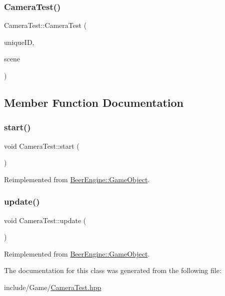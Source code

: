 \subsubsection{\texorpdfstring{Camera\+Test()}{CameraTest()}}
{\footnotesize\ttfamily Camera\+Test\+::\+Camera\+Test (\begin{DoxyParamCaption}\item[{int}]{unique\+ID,  }\item[{\mbox{\hyperlink{class_beer_engine_1_1_a_scene}{Beer\+Engine\+::\+A\+Scene}} \&}]{scene }\end{DoxyParamCaption})}



\subsection{Member Function Documentation}
\mbox{\label{class_camera_test_a33618b16d2906b67b68e55ad15a8a33b}} 
\subsubsection{\texorpdfstring{start()}{start()}}
{\footnotesize\ttfamily void Camera\+Test\+::start (\begin{DoxyParamCaption}\item[{void}]{ }\end{DoxyParamCaption})\hspace{0.3cm}{\ttfamily [virtual]}}



Reimplemented from \mbox{\hyperlink{class_beer_engine_1_1_game_object_a2caa6e6105c6766fdac3688ff1e74f00}{Beer\+Engine\+::\+Game\+Object}}.

\mbox{\label{class_camera_test_a5bacc3399e57aa311e8d5ea39c9865bf}} 
\subsubsection{\texorpdfstring{update()}{update()}}
{\footnotesize\ttfamily void Camera\+Test\+::update (\begin{DoxyParamCaption}\item[{void}]{ }\end{DoxyParamCaption})\hspace{0.3cm}{\ttfamily [virtual]}}



Reimplemented from \mbox{\hyperlink{class_beer_engine_1_1_game_object_ab53f4154cb5cecd0b1238465f7d1fc81}{Beer\+Engine\+::\+Game\+Object}}.



The documentation for this class was generated from the following file\+:\begin{DoxyCompactItemize}
\item 
include/\+Game/\mbox{\hyperlink{_camera_test_8hpp}{Camera\+Test.\+hpp}}\end{DoxyCompactItemize}
